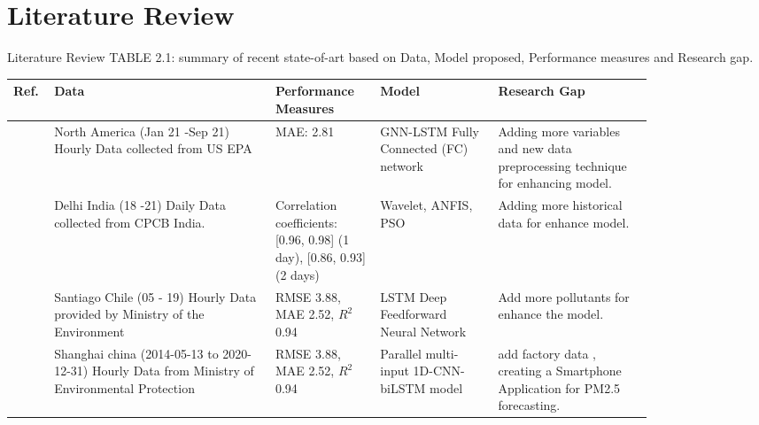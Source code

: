 \documentclass[12pt, aspectratio=169]{beamer}
\begin{document}
\section[Literature]{Literature Review}%
\begin{frame}{Literature Review}
	\centering
	\scriptsize {TABLE 2.1: summary of recent state-of-art based on Data,  Model proposed,  Performance measures and Research gap.}\\
	\begin{table}
		\centering
		\begin{tabular}{|p{0.03\linewidth}|p{0.3\linewidth}|p{0.14\linewidth}|p{0.16\linewidth}|p{0.21\linewidth}|}
			\hline
			\footnotesize \textbf {Ref.} & \footnotesize \textbf { Data} & \footnotesize \textbf {Performance Measures } & \footnotesize \textbf {Model} & \footnotesize \textbf {Research Gap }  \\ \hline
			\scriptsize \cite{li2023nested}                \scriptsize & North America (Jan 21 -Sep 21)   Hourly Data collected from US EPA                                       \scriptsize & MAE:  2.81                                                                                               \scriptsize & GNN-LSTM Fully Connected (FC) network                              \scriptsize & Adding more variables and new data preprocessing technique for enhancing model.                                    \\ \hline
			\scriptsize \cite{pruthi2022low}           \scriptsize & Delhi  India (18 -21) Daily Data collected from   CPCB India.                                            \scriptsize & Correlation coefficients:  {[}0.96, 0.98{]} (1   day),  {[}0.86, 0.93{]} (2 days) \scriptsize & Wavelet,  ANFIS,  PSO                                                 \scriptsize &  Adding more historical data for enhance model.                                                  \\ \hline
			\scriptsize \cite{menares2021forecasting}             \scriptsize & Santiago Chile (05 - 19) Hourly   Data provided by Ministry of the Environment                           \scriptsize & RMSE 3.88,  MAE 2.52,  $R^2$ 0.94                                                                            \scriptsize & LSTM Deep Feedforward Neural Network                               \scriptsize & Add more pollutants for enhance the model.               \\ \hline
			\scriptsize \cite{zhu2023investigation}            \scriptsize & Shanghai china (2014-05-13 to 2020-12-31)   Hourly Data from Ministry of Environmental Protection \scriptsize & RMSE 3.88,  MAE 2.52,  $R^2$ 0.94                                                                            \scriptsize & Parallel multi-input 1D-CNN-biLSTM   model                          \scriptsize & add  factory data ,  creating a Smartphone Application for PM2.5 forecasting.                                                         \\ \hline
	 \end{tabular}
	\end{table}
\end{frame}
\end{document}
